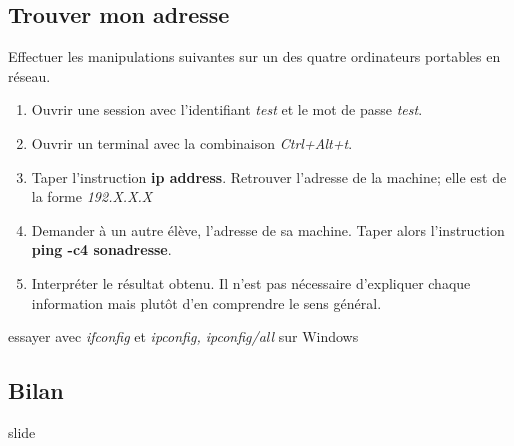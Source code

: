 \documentclass[a4paper,11pt]{article}
\begin{document}
\begin{Form}
\subsection{Trouver mon adresse}
Effectuer les manipulations suivantes sur un des quatre ordinateurs portables en réseau.
\begin{enumerate}
\item Ouvrir une session avec l'identifiant \emph{test} et le mot de passe \emph{test}.
\item Ouvrir un terminal avec la combinaison \emph{Ctrl+Alt+t}.
\item Taper l'instruction \textbf{ip address}. Retrouver l'adresse de la machine; elle est de la forme \emph{192.X.X.X}
\item Demander à un autre élève, l'adresse de sa machine. Taper alors l'instruction \textbf{ping -c4 sonadresse}.
\item Interpréter le résultat obtenu. Il n'est pas nécessaire d'expliquer chaque information mais plutôt d'en comprendre le sens général.
\end{enumerate}
\begin{commentprof}
essayer avec \emph{ifconfig} et \emph{ipconfig, ipconfig/all} sur Windows
\end{commentprof}
\begin{commentprof}
\section*{Bilan}
slide
\end{commentprof}
\end{Form}
\end{document}
